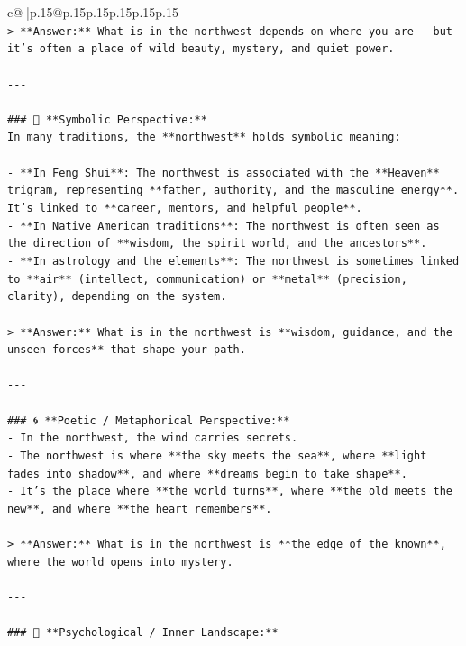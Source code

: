 \documentclass{article}
\begin{document}
{\begin{supertabular}{c@{$\;$}|p{.15\linewidth}@{}p{.15\linewidth}p{.15\linewidth}p{.15\linewidth}p{.15\linewidth}p{.15\linewidth}}
{{{\\ 
\texttt{> **Answer:** What is in the northwest depends on where you are — but it’s often a place of wild beauty, mystery, and quiet power.} \\
\\ 
\texttt{{-}{-}{-}} \\
\\ 
\texttt{\#\#\# 🌌 **Symbolic Perspective:**} \\
\texttt{In many traditions, the **northwest** holds symbolic meaning:} \\
\\ 
\texttt{{-} **In Feng Shui**: The northwest is associated with the **Heaven** trigram, representing **father, authority, and the masculine energy**. It’s linked to **career, mentors, and helpful people**.} \\
\texttt{{-} **In Native American traditions**: The northwest is often seen as the direction of **wisdom, the spirit world, and the ancestors**.} \\
\texttt{{-} **In astrology and the elements**: The northwest is sometimes linked to **air** (intellect, communication) or **metal** (precision, clarity), depending on the system.} \\
\\ 
\texttt{> **Answer:** What is in the northwest is **wisdom, guidance, and the unseen forces** that shape your path.} \\
\\ 
\texttt{{-}{-}{-}} \\
\\ 
\texttt{\#\#\# 🌀 **Poetic / Metaphorical Perspective:**} \\
\texttt{{-} In the northwest, the wind carries secrets.  } \\
\texttt{{-} The northwest is where **the sky meets the sea**, where **light fades into shadow**, and where **dreams begin to take shape**.  } \\
\texttt{{-} It’s the place where **the world turns**, where **the old meets the new**, and where **the heart remembers**.} \\
\\ 
\texttt{> **Answer:** What is in the northwest is **the edge of the known**, where the world opens into mystery.} \\
\\ 
\texttt{{-}{-}{-}} \\
\\ 
\texttt{\#\#\# 🧠 **Psychological / Inner Landscape:**} \\
}}}
\end{supertabular}}
\end{document}
